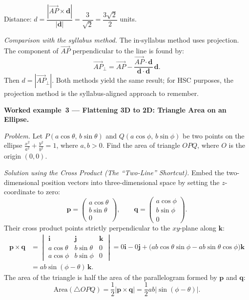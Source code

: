 Distance:
$d = \dfrac{|\overrightarrow{AP} \times \mathbf{d}|}{|\mathbf{d}|}
   = \dfrac{3}{\sqrt{2}}
   = \dfrac{3\sqrt{2}}{2}$ units.

\vspace{0.3em}
\noindent\textit{Comparison with the syllabus method.}
The in-syllabus method uses projection.
The component of $\overrightarrow{AP}$ perpendicular to the line is
found by:
\[
  \overrightarrow{AP}_{\perp}
  = \overrightarrow{AP}
  - \frac{\overrightarrow{AP} \cdot \mathbf{d}}
         {\mathbf{d} \cdot \mathbf{d}}\,\mathbf{d}.
\]
Then $d = |\overrightarrow{AP}_{\perp}|$.
Both methods yield the same result; for HSC purposes, the projection
method is the syllabus-aligned approach to remember.

\vspace{0.8em}
\noindent\textbf{Worked example~3 --- Flattening 3D to 2D: Triangle Area on an Ellipse.}

\noindent\textit{Problem.}
Let $P(a\cos\theta,\, b\sin\theta)$ and $Q(a\cos\phi,\, b\sin\phi)$ be two points on the ellipse $\frac{x^2}{a^2} + \frac{y^2}{b^2} = 1$, where $a, b > 0$. Find the area of triangle $OPQ$, where $O$ is the origin $(0,0)$.

\vspace{0.3em}
\noindent\textit{Solution using the Cross Product (The ``Two-Line'' Shortcut).}
Embed the two-dimensional position vectors into three-dimensional space by setting the $z$-coordinate to zero:
\[
  \mathbf{p} = \begin{pmatrix} a\cos\theta \\ b\sin\theta \\ 0 \end{pmatrix},
  \qquad
  \mathbf{q} = \begin{pmatrix} a\cos\phi \\ b\sin\phi \\ 0 \end{pmatrix}.
\]
Their cross product points strictly perpendicular to the $xy$-plane along $\mathbf{k}$:
\begin{align*}
  \mathbf{p} \times \mathbf{q}
  &= \begin{vmatrix}
       \mathbf{i} & \mathbf{j} & \mathbf{k} \\
       a\cos\theta & b\sin\theta & 0 \\
       a\cos\phi & b\sin\phi & 0
     \end{vmatrix}
  = 0\mathbf{i} - 0\mathbf{j} + \bigl(ab\cos\theta\sin\phi - ab\sin\theta\cos\phi\bigr)\mathbf{k} \\
  &= ab\sin(\phi - \theta)\,\mathbf{k}.
\end{align*}
The area of the triangle is half the area of the parallelogram formed by $\mathbf{p}$ and $\mathbf{q}$:
\[
  \boxed{\text{Area}(\triangle OPQ) = \frac{1}{2}|\mathbf{p} \times \mathbf{q}| = \frac{1}{2}ab|\sin(\phi - \theta)|}.
\]

